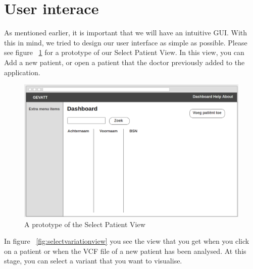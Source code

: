 \section{User interace}
As mentioned earlier, it is important that we will have an intuitive GUI. With this in mind, we tried to design our user interface as simple as possible. Please see figure ~\ref{fig:selectpatientview} for a prototype of our Select Patient View. In this view, you can Add a new patient, or open a patient that the doctor previously added to the application.\\
\begin{figure}[h]
\includegraphics[scale=0.4]{select_patient.png}
\caption{A prototype of the Select Patient View}
\label{fig:selectpatientview}
\end{figure} 
In figure ~\ref{fig:selectvariationview} you see the view that you get when you click on a patient or when the VCF file of a new patient has been analysed. At this stage, you can select a variant that you want to visualise.

